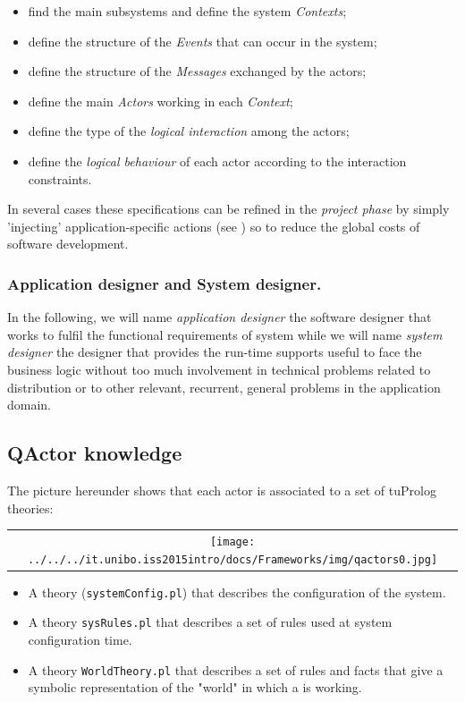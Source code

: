 \begin{itemize}
	\item find the main subsystems and define the system \textit{Contexts};
	\item define the structure of the \textit{Events} that can occur in the system;
	\item define the structure of the \textit{Messages} exchanged by the actors;
	\item define the main \textit{Actors} working in each \textit{Context};
	\item define the type of the \textit{logical interaction} among the actors;
	\item define the \textit{logical behaviour} of each actor according to the interaction constraints.
\end{itemize}

In several cases these specifications can be refined in the \textit{project phase} by simply 'injecting' application-specific actions (see ) so to reduce the global costs of software development.

\subsubsection{Application designer and System designer.}

In the following, we will name  \textit{application designer} the software designer that works to fulfil the functional requirements of system while we will name  \textit{system designer} the designer that provides the run-time supports useful to face the business logic without too much involvement in technical problems related to distribution or to other relevant, recurrent, general problems in the application domain.

\subsection{QActor knowledge}
The picture hereunder shows that each actor is associated to a set of tuProlog theories:
\begin{center}
\begin{tabular}{ c }
     \texttt{[image: ../../../it.unibo.iss2015intro/docs/Frameworks/img/qactors0.jpg]}
\end{tabular}{   }
\end{center}

\begin{itemize}
\item A theory (\texttt{systemConfig.pl}) that describes the configuration of the system.
\item A theory \texttt{sysRules.pl} that describes a set of rules used at system configuration time.
\item A theory \texttt{WorldTheory.pl} that describes a set of rules and facts that give a symbolic representation of the "world" in which a \qa{} is working.
\end{itemize}

